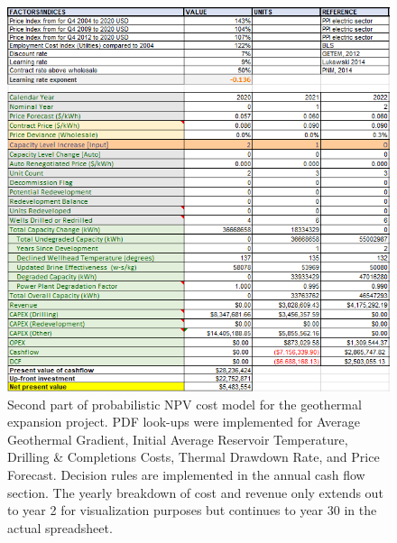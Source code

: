 \begin{figure}[H]
\centering
\includegraphics[width=\textwidth]{templates/images/Figure-Flexible_Model_SheetB.png}
\caption[Probabilistic cost model worksheet (part 2)]{Second part of probabilistic NPV cost model for the geothermal expansion project. PDF look-ups were implemented for Average Geothermal Gradient, Initial Average Reservoir Temperature, Drilling \& Completions Costs, Thermal Drawdown Rate, and Price Forecast. Decision rules are implemented in the annual cash flow section. The yearly breakdown of cost and revenue only extends out to year 2 for visualization purposes but continues to year 30 in the actual spreadsheet.}
\label{fig:probabilistic_model_sheet2}
\end{figure}